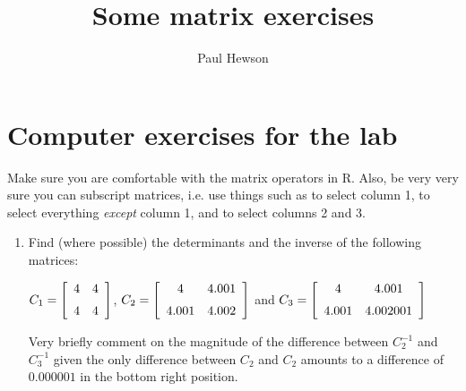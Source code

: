 \documentclass{article}
\title{Some matrix exercises}
\author{Paul Hewson}
\begin{document}
\maketitle

\section{Computer exercises for the lab}

Make sure you are comfortable with the matrix operators in R.   Also, be very very sure you can subscript matrices, i.e. use things such as \text{[,1]} to select column 1, \text{[,-1]} to select everything \emph{except} column 1, and \text{[,2:3]} to select columns 2 and 3.

\begin{enumerate}

\item Find (where possible) the determinants and the inverse of the following matrices:

$C_{1} = \left[ \begin {array}{cc} 4& 4\\\noalign{\medskip} 4& 4\end {array} \right]$, $C_{2} = \left[ \begin {array}{cc} 4& 4.001\\\noalign{\medskip} 4.001& 4.002\end {array} \right]$ and $C_{3} = \left[ \begin {array}{cc} 4& 4.001\\\noalign{\medskip} 4.001& 4.002001\end {array} \right] $

Very briefly comment on the magnitude of the difference between $C_{2}^{-1}$ and  $C_{3}^{-1}$ given the only difference between $C_{2}$ and $C_{2}$ amounts to a difference of $0.000001$ in the bottom right position.



\end{enumerate}
\end{document}
